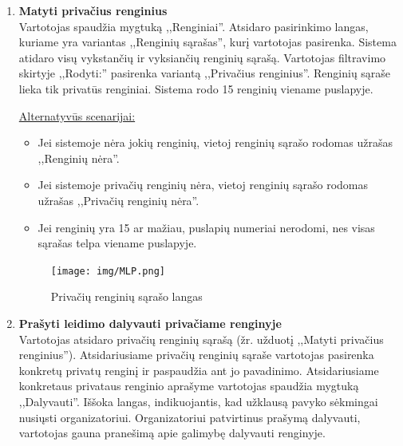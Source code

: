\documentclass{VUMIFPSkursinis}
\begin{document}
\begin{enumerate} [label = \textbf{U\arabic*.}]
					\underline{Alternatyvūs scenarijai:}
					\begin{itemize}
						\item Jeigu detalesnės informacijos apie organizatorių nėra, sistemoje pateikiamas užrašas ,,Šios inforamacijos nėra''.
						\item Jeigu sistemoje nėra renginių, vartotojui pateikiama žinutė:
						,,Atsiprašome, jums prieinamų renginių nėra. Norėdami pamatyti daugiau pasirinkimų, prisijunkite.''
					\end{itemize}

				\begin{figure}[H]
					\centering
					\texttt{[image: img/MLP.png]}
					\caption{Renginio organizatoriaus informacijos patikrinimo langas}
					\label{fig:patikrinti-renginio-organizatoriaus-informacija}
				\end{figure}
			
			\item \textbf{Matyti privačius renginius} \\
					Vartotojas spaudžia mygtuką ,,Renginiai''.
					Atsidaro pasirinkimo langas, kuriame yra variantas ,,Renginių sąrašas'', kurį vartotojas pasirenka.
					Sistema atidaro visų vykstančių ir vyksiančių renginių sąrašą.
					Vartotojas filtravimo skirtyje ,,Rodyti:'' pasirenka variantą ,,Privačius renginius''.
					Renginių sąraše lieka tik privatūs renginiai.
					Sistema rodo 15 renginių viename puslapyje.
					
					\underline{Alternatyvūs scenarijai:}
					\begin{itemize}
						\item Jei sistemoje nėra jokių renginių, vietoj renginių sąrašo rodomas užrašas ,,Renginių nėra''.
						\item Jei sistemoje privačių renginių nėra, vietoj renginių sąrašo rodomas užrašas ,,Privačių renginių nėra''.
						\item Jei renginių yra 15 ar mažiau, puslapių numeriai nerodomi, nes visas sąrašas telpa viename puslapyje.
					\end{itemize}
				
				\begin{figure}[H]
					\centering
					\texttt{[image: img/MLP.png]}
					\caption{Privačių renginių sąrašo langas}
					\label{fig:matyti-privacius-renginius}
				\end{figure}
			\item \textbf{Prašyti leidimo dalyvauti privačiame renginyje} \\
					Vartotojas atsidaro privačių renginių sąrašą (žr. užduotį ,,Matyti privačius renginius'').
					Atsidariusiame privačių renginių sąraše vartotojas pasirenka konkretų privatų renginį ir paspaudžia ant jo pavadinimo.
					Atsidariusiame konkretaus privataus renginio aprašyme vartotojas spaudžia mygtuką ,,Dalyvauti''.
					Iššoka langas, indikuojantis, kad užklausą pavyko sėkmingai nusiųsti organizatoriui.
					Organizatoriui patvirtinus prašymą dalyvauti, vartotojas gauna pranešimą apie galimybę dalyvauti renginyje.
					

\end{enumerate}
\end{document}
